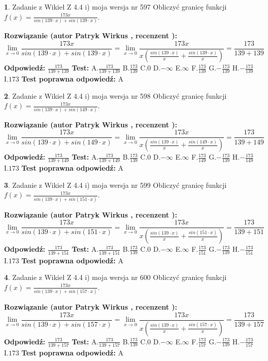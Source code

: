 \documentclass[12pt, a4paper]{article}
\theoremstyle{definition} %
\newtheorem{zad}{}
\newcommand{\zadStart}[1]{\begin{zad}#1\newline}
\newcommand{\zadStop}{\end{zad}}
\newcommand{\rozwStart}[2]{\noindent \textbf{Rozwiązanie (autor #1 , recenzent #2): }\newline}
\newcommand{\rozwStop}{\newline}
\newcommand{\odpStart}{\noindent \textbf{Odpowiedź:}\newline}
\newcommand{\odpStop}{\newline}
\newcommand{\testStart}{\noindent \textbf{Test:}\newline}
\newcommand{\testStop}{\newline}
\newcommand{\kluczStart}{\noindent \textbf{Test poprawna odpowiedź:}\newline}
\newcommand{\kluczStop}{\newline}
\begin{document}
\zadStart{Zadanie z Wikieł Z 4.4 i) moja wersja nr 597}
Obliczyć granicę funkcji $f(x)=\frac{173x}{sin(139\cdot x) +sin(139\cdot x)}$.
\zadStop
\rozwStart{Patryk Wirkus}{}
$$\lim\limits_{x\to 0}\frac{173x}{sin(139\cdot x) +sin(139\cdot x)}=\lim\limits_{x\to 0}\frac{173x}{x(\frac{sin(139\cdot x)}{x}+\frac{sin(139\cdot x)}{x})}=\frac{173}{139+139}$$
\rozwStop
\odpStart
$\frac{173}{139+139}$
\odpStop
\testStart
A.$\frac{173}{139+139}$
B.$\frac{173}{139}$
C.$0$
D.$-\infty$
E.$\infty$
F.$\frac{173}{139}$
G.$-\frac{173}{139}$
H.$-\frac{173}{139}$
I.$173$
\testStop
\kluczStart
A
\kluczStop



\zadStart{Zadanie z Wikieł Z 4.4 i) moja wersja nr 598}
Obliczyć granicę funkcji $f(x)=\frac{173x}{sin(139\cdot x) +sin(149\cdot x)}$.
\zadStop
\rozwStart{Patryk Wirkus}{}
$$\lim\limits_{x\to 0}\frac{173x}{sin(139\cdot x) +sin(149\cdot x)}=\lim\limits_{x\to 0}\frac{173x}{x(\frac{sin(139\cdot x)}{x}+\frac{sin(149\cdot x)}{x})}=\frac{173}{139+149}$$
\rozwStop
\odpStart
$\frac{173}{139+149}$
\odpStop
\testStart
A.$\frac{173}{139+149}$
B.$\frac{173}{139}$
C.$0$
D.$-\infty$
E.$\infty$
F.$\frac{173}{149}$
G.$-\frac{173}{139}$
H.$-\frac{173}{149}$
I.$173$
\testStop
\kluczStart
A
\kluczStop



\zadStart{Zadanie z Wikieł Z 4.4 i) moja wersja nr 599}
Obliczyć granicę funkcji $f(x)=\frac{173x}{sin(139\cdot x) +sin(151\cdot x)}$.
\zadStop
\rozwStart{Patryk Wirkus}{}
$$\lim\limits_{x\to 0}\frac{173x}{sin(139\cdot x) +sin(151\cdot x)}=\lim\limits_{x\to 0}\frac{173x}{x(\frac{sin(139\cdot x)}{x}+\frac{sin(151\cdot x)}{x})}=\frac{173}{139+151}$$
\rozwStop
\odpStart
$\frac{173}{139+151}$
\odpStop
\testStart
A.$\frac{173}{139+151}$
B.$\frac{173}{139}$
C.$0$
D.$-\infty$
E.$\infty$
F.$\frac{173}{151}$
G.$-\frac{173}{139}$
H.$-\frac{173}{151}$
I.$173$
\testStop
\kluczStart
A
\kluczStop



\zadStart{Zadanie z Wikieł Z 4.4 i) moja wersja nr 600}
Obliczyć granicę funkcji $f(x)=\frac{173x}{sin(139\cdot x) +sin(157\cdot x)}$.
\zadStop
\rozwStart{Patryk Wirkus}{}
$$\lim\limits_{x\to 0}\frac{173x}{sin(139\cdot x) +sin(157\cdot x)}=\lim\limits_{x\to 0}\frac{173x}{x(\frac{sin(139\cdot x)}{x}+\frac{sin(157\cdot x)}{x})}=\frac{173}{139+157}$$
\rozwStop
\odpStart
$\frac{173}{139+157}$
\odpStop
\testStart
A.$\frac{173}{139+157}$
B.$\frac{173}{139}$
C.$0$
D.$-\infty$
E.$\infty$
F.$\frac{173}{157}$
G.$-\frac{173}{139}$
H.$-\frac{173}{157}$
I.$173$
\testStop
\kluczStart
A
\kluczStop
\end{document}
